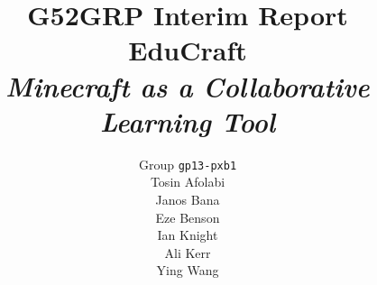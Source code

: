 \documentclass[11pt,a4paper]{report}
\begin{document}
\title{{\normalsize G52GRP Interim Report}\\EduCraft\\\textit{Minecraft as a Collaborative Learning Tool}}
\author{Group \texttt{gp13-pxb1}\\
            Tosin Afolabi\\
            Janos Bana\\
            Eze Benson\\
            Ian Knight\\
            Ali Kerr\\
            Ying Wang
            }
\maketitle







\end{document}
